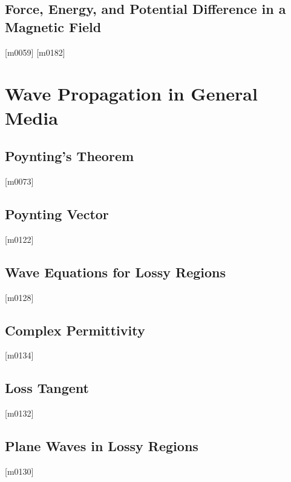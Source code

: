 \documentclass[10pt,letterpaper,twocolumn,openany]{book}
\theoremstyle{definition} %
\begin{document}
    \section{Force, Energy, and Potential Difference in a Magnetic Field}
{\color{blue}\tiny[m0059]}      
      \vfill\break
{\color{blue}\tiny[m0182]}    
  \chapter{Wave Propagation in General Media}
  \thispagestyle{fancy} %
  \fancyhf{}            %
    \section{Poynting's Theorem}
{\color{blue}\tiny[m0073]}      
      \vfill\break
    \section{Poynting Vector}
{\color{blue}\tiny[m0122]}      
      \vfill\break
    \section{Wave Equations for Lossy Regions}
{\color{blue}\tiny[m0128]}      
      \vfill\break
    \section{Complex Permittivity}
{\color{blue}\tiny[m0134]}      
      \vfill\break
    \section{Loss Tangent}
{\color{blue}\tiny[m0132]}      
      \vfill\break
    \section{Plane Waves in Lossy Regions}
{\color{blue}\tiny[m0130]}      
      \vfill\break
\end{document}
